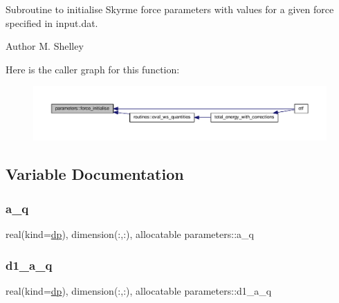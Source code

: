 Subroutine to initialise Skyrme force parameters with values for a given force specified in \textquotesingle{}input.\+dat\textquotesingle{}. 

\begin{DoxyAuthor}{Author}
M. Shelley 
\end{DoxyAuthor}
Here is the caller graph for this function\+:
\nopagebreak
\begin{figure}[H]
\begin{center}
\leavevmode
\includegraphics[width=350pt]{namespaceparameters_a55242f635842d12dbb53d66ae9248b93_icgraph}
\end{center}
\end{figure}


\subsection{Variable Documentation}
\mbox{\label{namespaceparameters_a537af93b5aaa713688d624f145ebde80}} 
\subsubsection{\texorpdfstring{a\+\_\+q}{a\_q}}
{\footnotesize\ttfamily real(kind=\mbox{\hyperlink{namespaceparameters_a52f8c6351fd79345d8811e065bcbbb37}{dp}}), dimension(\+:,\+:), allocatable parameters\+::a\+\_\+q}

\mbox{\label{namespaceparameters_aaeb8117f8c15d7a7414e15929e12b0a8}} 
\subsubsection{\texorpdfstring{d1\+\_\+a\+\_\+q}{d1\_a\_q}}
{\footnotesize\ttfamily real(kind=\mbox{\hyperlink{namespaceparameters_a52f8c6351fd79345d8811e065bcbbb37}{dp}}), dimension(\+:,\+:), allocatable parameters\+::d1\+\_\+a\+\_\+q}

\mbox{\label{namespaceparameters_ab2833e12dbfca51501df8955b00dd7d0}} 

